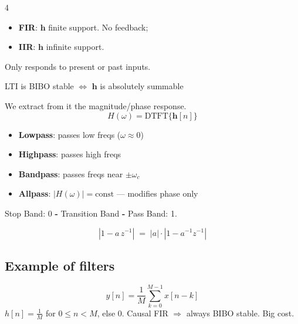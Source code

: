 \documentclass[8pt,a4paper,landscape]{extarticle}
\begin{document}
\begin{multicols*}{4}
\begin{defn}[title=FIR vs IIR (Finite/Infinite Impulse Response)]
\begin{itemize}
  \item \textbf{FIR}: $\mathbf{h}$ finite support. No feedback;
  \item \textbf{IIR}: $\mathbf{h}$ infinite support.
\end{itemize}
\end{defn}

\begin{defn}[title=Definition of causal]
Only responds to present or past inputs.
\end{defn}

\begin{thm}[title=BIBO Stability]
LTI is BIBO stable $\Longleftrightarrow$ $\mathbf{h}$ is absolutely summable
\end{thm}

\begin{thm}[title=Frequency Response]
We extract from it the magnitude/phase response.
\[H(\omega)= \mathrm{DTFT}\{\boldsymbol{h}[n]\} \]
\end{thm}

\begin{prop}[title=Filter types by magnitude response]
\begin{itemize}
  \item \textbf{Lowpass}: passes low freqs ($\omega\approx 0$)
  \item \textbf{Highpass}: passes high freqs
  \item \textbf{Bandpass}: passes freqs near $\pm\omega_c$
  \item \textbf{Allpass}: $|H(\omega)|=\text{const}$ — modifies phase only
\end{itemize}
Stop Band: 0 \textbf{-} Transition Band \textbf{-} Pass Band: 1.
\end{prop}

\begin{warn}[title=Unit-circle modulus reflection identity]
\[
\left|1 - a\,z^{-1}\right| \;=\; |a| \cdot \left|1 - a^{-1} z^{-1}\right|
\]
\end{warn}
\subsection{Example of filters}

\begin{defn}[title=Moving Average (MA)]
\[y[n]=\frac{1}{M}\sum_{k=0}^{M-1}x[n-k]\]
$h[n]=\tfrac{1}{M}$ for $0\le n<M$, else $0$.
Causal FIR $\Rightarrow$ always BIBO stable. Big cost.
\end{defn}


\end{multicols*}
\end{document}
